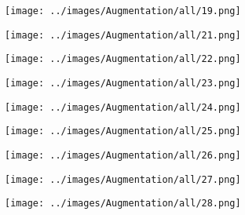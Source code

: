 \begin{figure}[H]
\begin{subfigure}[b]{0.1\textwidth}
\end{subfigure}
\hspace{1em}%
\begin{subfigure}[b]{0.1\textwidth}
 \centering
 \texttt{[image: ../images/Augmentation/all/19.png]}
\end{subfigure}
\hspace{1em}%
\begin{subfigure}[b]{0.1\textwidth}
\centering
\texttt{[image: ../images/Augmentation/all/21.png]}
\end{subfigure}
\hspace{1em}%
\begin{subfigure}[b]{0.1\textwidth}
 \centering
 \texttt{[image: ../images/Augmentation/all/22.png]}
\end{subfigure}
\hspace{1em}%
\begin{subfigure}[b]{0.1\textwidth}
 \centering
 \texttt{[image: ../images/Augmentation/all/23.png]}
\end{subfigure}
\hspace{1em}%
\begin{subfigure}[b]{0.1\textwidth}
 \centering
 \texttt{[image: ../images/Augmentation/all/24.png]}
\end{subfigure}
\hspace{1em}%
\begin{subfigure}[b]{0.1\textwidth}
\centering
\texttt{[image: ../images/Augmentation/all/25.png]}
\end{subfigure}
\hspace{1em}%
\begin{subfigure}[b]{0.1\textwidth}
 \centering
 \texttt{[image: ../images/Augmentation/all/26.png]}
\end{subfigure}
\hspace{1em}%
\begin{subfigure}[b]{0.1\textwidth}
 \centering
 \texttt{[image: ../images/Augmentation/all/27.png]}
\end{subfigure}
\hspace{1em}%
\begin{subfigure}[b]{0.1\textwidth}
 \centering
 \texttt{[image: ../images/Augmentation/all/28.png]}
\end{subfigure}
\hspace{1em}%
\begin{subfigure}[b]{0.1\textwidth}

\end{subfigure}
\end{figure}
